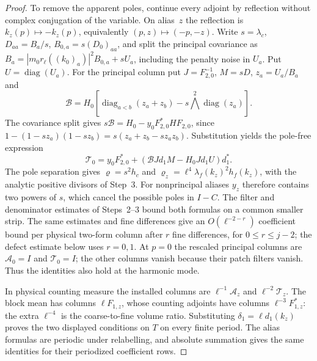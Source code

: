 \begin{proof}
To remove the apparent poles, continue every adjoint by reflection without complex conjugation of the variable. On alias~$z$ the reflection is $k_z(p)\mapsto-k_z(p)$, equivalently $(p,z)\mapsto(-p,-z)$. Write $s=\lambda_c$, $D_{aa}=B_a/s$, $B_{0,a}=s(D_0)_{aa}$, and split the principal covariance as $B_a=|m_0r_\ell((k_0)_a)|^2B_{0,a}+sU_a$, including the penalty noise in $U_a$. Put $U=\operatorname{diag}(U_a)$. For the principal column put $J=F_{2,0}^{-1}$, $M=sD$, $z_a=U_a/B_a$ and
\begin{equation*}
\mathcal B=H_0\left[\operatorname{diag}_{a<b}(z_a+z_b)-s\bigwedge^2\operatorname{diag}(z_a)\right].
\end{equation*}
The covariance split gives $s\mathcal B=H_0-y_0F_{2,0}^*HF_{2,0}$, since $1-(1-sz_a)(1-sz_b)=s(z_a+z_b-sz_az_b)$. Substitution yields the pole-free expression
\begin{equation*}
\mathcal T_0=y_0F_{2,0}^*+(\mathcal B Jd_1M-H_0Jd_1U)d_1^*.
\end{equation*}
The pole separation gives $\varrho=s^2h_c$ and $\varrho_z=\ell^4\lambda_f(k_z)^2h_f(k_z)$, with the analytic positive divisors of Step~3. For nonprincipal aliases $y_z$ therefore contains two powers of $s$, which cancel the possible poles in $I-C$. The filter and denominator estimates of Steps~2--3 bound both formulas on a common smaller strip. The same estimates and fine differences give an $O(\ell^{-2-r})$ coefficient bound per physical two-form column after $r$ fine differences, for $0\le r\le j-2$; the defect estimate below uses $r=0,1$. At $p=0$ the rescaled principal columns are $\mathcal A_0=I$ and $\mathcal T_0=I$; the other columns vanish because their patch filters vanish. Thus the identities also hold at the harmonic mode.

In physical counting measure the installed columns are $\ell^{-1}\mathcal A_z$ and $\ell^{-2}\mathcal T_z$. The block mean has columns $\ell F_{1,z}$, whose counting adjoints have columns $\ell^{-3}F_{1,z}^*$: the extra $\ell^{-4}$ is the coarse-to-fine volume ratio. Substituting $\delta_1=\ell d_1(k_z)$ proves the two displayed conditions on $T$ on every finite period. The alias formulas are periodic under relabelling, and absolute summation gives the same identities for their periodized coefficient rows.


\end{proof}
